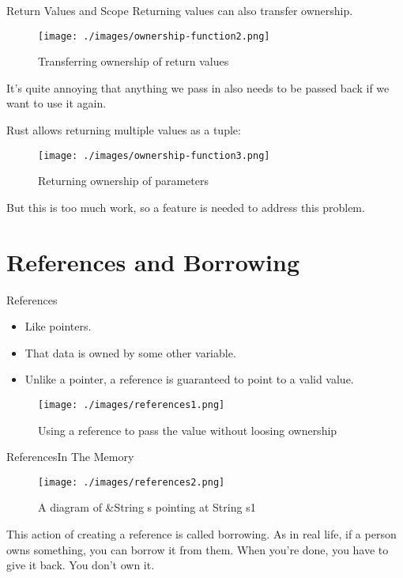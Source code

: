 \documentclass[10pt]{beamer}
\begin{document}
\begin{frame}{Return Values and Scope}
    Returning values can also transfer ownership.\cite{rust-book}
    \begin{figure}[htpb]
        \centering
        \texttt{[image: ./images/ownership-function2.png]}
        \vspace*{-2mm}
        \caption{Transferring ownership of return values\cite{rust-book}}
    \end{figure}
\end{frame}

\begin{frame}
    It’s quite annoying that anything we pass in also needs to be passed back if we want to use it again.\cite{rust-book}

    Rust allows returning multiple values as a tuple:
    \begin{figure}[htpb]
        \centering
        \texttt{[image: ./images/ownership-function3.png]}
        \caption{Returning ownership of parameters}
    \end{figure}

    But this is too much work, so a feature is needed to address this problem.
\end{frame}

\section{References and Borrowing}
\begin{frame}{References}
    \begin{itemize}
        \item Like pointers.
        \item That data is owned by some other variable.
        \item Unlike a pointer, a reference is guaranteed to point to a valid value.
    \end{itemize}

    \begin{figure}[htpb]
        \centering
        \texttt{[image: ./images/references1.png]}
        \caption{Using a reference to pass the value without loosing ownership\cite{rust-book}}
    \end{figure}
\end{frame}

\begin{frame}{References}{In The Memory}
    \begin{figure}[htpb]
        \centering
        \texttt{[image: ./images/references2.png]}
        \caption{A diagram of \&String s pointing at String s1\cite{rust-book}}
    \end{figure}

    \vspace*{-2mm}
    This action of creating a reference is called borrowing. As in real life, if a person owns something, you can borrow it from them. When you’re done, you have to give it back. You don’t own it.\cite{rust-book}
\end{frame}
\end{document}
